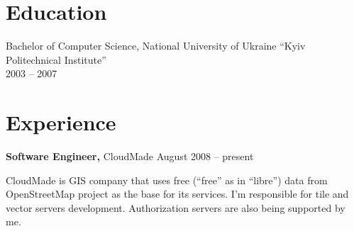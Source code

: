 \documentclass[margin]{res}
\begin{document}

\address{{\bf Address} \\ Mercatorplein 36-K \\ 1056CL, Amsterdam, The Netherlands}

\address{{\bf Contacts} \\ +31 (62) 980-61-41 \\ contact@mishkovskyi.net \\ skype: andriy.mishkovskyy \\ \href{http://mishkovskyi.net}{mishkovskyi.net}}

\begin{resume}


\section{Education}
Bachelor of Computer Science, National University of Ukraine ``Kyiv Politechnical Institute'' \\
2003 -- 2007

\section{Experience}
{\bf Software Engineer,} CloudMade \hfill August 2008 -- present

CloudMade is GIS company that uses free
(``free'' as in ``libre'') data from OpenStreetMap project as
the base for its services. I'm responsible for tile and
vector servers development. Authorization servers are also
being supported by me.\\


\end{resume}
\end{document}
